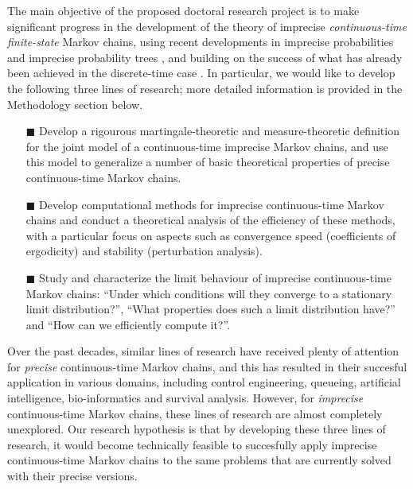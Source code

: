 \documentclass[11pt,dvipsnames,usenames,a4paper]{article}
\begin{document}
The main objective of the proposed doctoral research project is to make significant progress in the development of the theory of imprecise \emph{continuous-time} \emph{finite-state} Markov chains, using recent developments in imprecise probabilities \cite{augustin2013:itip,troffaes2013:lp} and imprecise probability trees \cite{shafer2001,cooman2007d}, and building on the success of what has already been achieved in the discrete-time case \cite{cooman2008,hermans2012,skulj2013,cooman2015:markovergodic}. In particular, we would like to develop the following three lines of research; more detailed information is provided in the Methodology section below.

\vspace{6pt}
\begin{itemize}
\item[\tiny$\blacksquare$]
Develop a rigourous martingale-theoretic and measure-theoretic definition for the joint model of a continuous-time imprecise Markov chains, and use this model to generalize a number of basic theoretical properties of precise continuous-time Markov chains.
\item[\tiny$\blacksquare$]
Develop computational methods for imprecise continuous-time Markov chains and conduct a theoretical analysis of the efficiency of these methods, with a particular focus on aspects such as convergence speed (coefficients of ergodicity) and stability (perturbation analysis).
\item[\tiny$\blacksquare$]
Study and characterize the limit behaviour of imprecise continuous-time Markov chains: ``Under which conditions will they converge to a stationary limit distribution?'', ``What properties does such a limit distribution have?'' and ``How can we efficiently compute it?''. 
\end{itemize}
\vspace{6pt}

Over the past decades, similar lines of research have received plenty of attention for \emph{precise} continuous-time Markov chains, and this has resulted in their succesful application in various domains, including control engineering, queueing, artificial intelligence, bio-informatics and survival analysis.
However, for \emph{imprecise} continuous-time Markov chains, these lines of research are almost completely unexplored.
Our research hypothesis is that by developing these three lines of research, it would become technically feasible to succesfully apply imprecise continuous-time Markov chains to the same problems that are currently solved with their precise versions.
\end{document}
